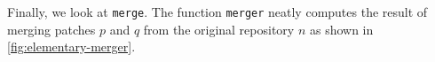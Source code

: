 Finally, we look at \texttt{merge}. The function \texttt{merger} neatly computes the result of
merging patches $p$ and $q$ from the original repository $n$ as shown in
\autoref{fig:elementary-merger}.
\begin{code}%
%
\>[2]\AgdaSpace{}%
\AgdaSymbol{:}\AgdaSpace{}%
\AgdaSpace{}%
\AgdaSpace{}%
\AgdaSpace{}%
\AgdaSpace{}%
\AgdaSpace{}%
\AgdaSpace{}%
\AgdaSpace{}%
\AgdaSpace{}%
\<%
\\
%
\>[2]\AgdaSpace{}%
\AgdaSpace{}%
\AgdaSpace{}%
\AgdaSpace{}%
\AgdaSymbol{=}\AgdaSpace{}%
%
\>[145I]\AgdaSpace{}%
\AgdaSymbol{=}\AgdaSpace{}%
\AgdaSpace{}%
\AgdaSpace{}%
\<%
\\
\>[.][@{}l@{}]\<[145I]%
\>[21]\AgdaSpace{}%
\AgdaSymbol{=}\AgdaSpace{}%
\AgdaSpace{}%
\AgdaSpace{}%
\<%
\\
%
\>[21]\AgdaSymbol{(}\AgdaSpace{}%
\AgdaOperator{\AgdaInductiveConstructor{,}}\AgdaSpace{}%
\AgdaSymbol{)}\AgdaSpace{}%
\AgdaSymbol{=}\AgdaSpace{}%
\AgdaSpace{}%
\AgdaSymbol{(}\AgdaSpace{}%
\AgdaOperator{\AgdaInductiveConstructor{,}}\AgdaSpace{}%
\AgdaSymbol{)}\<%
\\
\>[2][@{}l@{\AgdaIndent{0}}]%
\>[4]\AgdaSpace{}%
\AgdaSymbol{(}\AgdaSpace{}%
\AgdaSpace{}%
\AgdaSpace{}%
\AgdaOperator{\AgdaInductiveConstructor{,}}\AgdaSpace{}%
\AgdaSpace{}%
\AgdaSpace{}%
\AgdaSymbol{)}\<%
\end{code}

